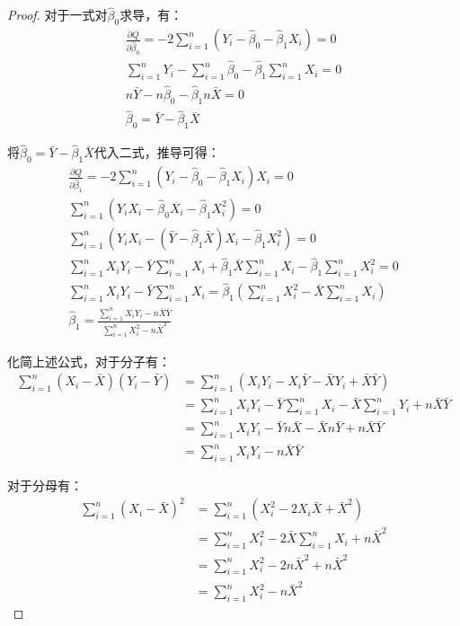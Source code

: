 \documentclass[11pt]{article}
\begin{document}
\begin{proof}
对于一式对$\hat{\beta}_0$求导，有：
\begin{gather*}
    \frac{\partial Q}{\partial \hat{\beta}_0} = -2 \sum_{i=1}^{n} \left( Y_i - \hat{\beta}_0 - \hat{\beta}_1 X_i \right) = 0 \\
    \sum_{i=1}^{n} Y_i - \sum_{i=1}^{n} \hat{\beta}_0 - \hat{\beta}_1 \sum_{i=1}^{n} X_i = 0 \\
    n \bar{Y} - n \hat{\beta}_0  - \hat{\beta}_1 n \bar{X} = 0 \\
    \hat{\beta}_0 = \bar{Y} - \hat{\beta}_1 \bar{X}
\end{gather*}

将$\hat{\beta}_0 = \bar{Y} - \hat{\beta}_1 \bar{X}$代入二式，推导可得：
\begin{gather*}
    \frac{\partial Q}{\partial \hat{\beta}_1} = -2 \sum_{i=1}^{n} \left( Y_i - \hat{\beta}_0 - \hat{\beta}_1 X_i \right) X_i = 0 \\
    \sum_{i=1}^{n} \left( Y_i X_i - \hat{\beta}_0 X_i - \hat{\beta}_1 X_i^2 \right) = 0 \\
    \sum_{i=1}^{n} \left( Y_i X_i - (\bar{Y} - \hat{\beta}_1 \bar{X}) X_i - \hat{\beta}_1 X_i^2 \right) = 0 \\
    \sum_{i=1}^{n} X_i Y_i - \bar{Y} \sum_{i=1}^{n} X_i + \hat{\beta}_1 \bar{X} \sum_{i=1}^{n} X_i - \hat{\beta}_1 \sum_{i=1}^{n} X_i^2 = 0 \\
    \sum_{i=1}^{n} X_i Y_i - \bar{Y} \sum_{i=1}^{n} X_i = \hat{\beta}_1 \left( \sum_{i=1}^{n} X_i^2 - \bar{X} \sum_{i=1}^{n} X_i \right) \\
    \hat{\beta}_1 = \frac{\sum_{i=1}^{n} X_i Y_i - n \bar{X} \bar{Y}}{\sum_{i=1}^{n} X_i^2 - n \bar{X}^2}
\end{gather*}

化简上述公式，对于分子有：
\begin{align*}
    \sum_{i=1}^{n} \left(X_i - \bar{X}\right) \left(Y_i - \bar{Y}\right)
    &= \sum_{i=1}^{n} \left( X_i Y_i - X_i\bar{Y} - \bar{X}Y_i + \bar{X}\bar{Y} \right) \\
    &=\sum_{i=1}^{n} X_i Y_i - \bar{Y} \sum_{i=1}^{n} X_i - \bar{X} \sum_{i=1}^{n} Y_i + n\bar{X}\bar{Y} \\
    &=\sum_{i=1}^{n} X_i Y_i - \bar{Y} n \bar{X} - \bar{X} n \bar{Y} + n\bar{X}\bar{Y} \\
    &=\sum_{i=1}^{n} X_i Y_i - n\bar{X}\bar{Y}
\end{align*}

对于分母有：
\begin{align*}
    \sum_{i=1}^{n} \left(X_i - \bar{X}\right)^2
    &= \sum_{i=1}^{n} \left( X_i^2 - 2 X_i\bar{X} + \bar{X}^2 \right) \\
    &= \sum_{i=1}^{n} X_i^2 - 2 \bar{X} \sum_{i=1}^{n} X_i + n\bar{X}^2 \\
    &= \sum_{i=1}^{n} X_i^2 - 2 n \bar{X}^2 + n\bar{X}^2 \\
    &= \sum_{i=1}^{n} X_i^2 - n \bar{X}^2 
\end{align*}


\end{proof}
\end{document}
